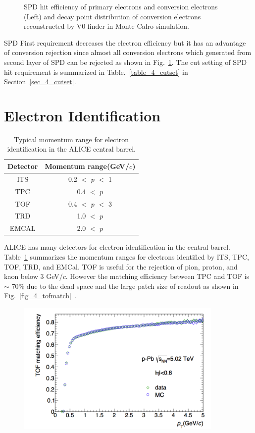 {\begin{figure}[h]
\begin{minipage}{0.5\hsize}
 \end{minipage}
  \caption{ 
  	SPD hit efficiency of primary electrons and conversion electrons (Left) and decay point distribution of conversion electrons reconstructed by V0-finder in Monte-Calro simulation.
  }
  \label{fig_4_spdhitdep}
\end{figure}
SPD First requirement decreases the electron efficiency but it has an advantage of conversion rejection since almost all conversion electrons which generated from second layer of SPD can be rejected as shown in Fig.~\ref{fig_4_spdhitdep}. 
The cut setting of SPD hit requirement is summarized in Table.~\ref{table_4_cutset} in Section~\ref{sec_4_cutset}.

\section{Electron Identification}
\label{sec_4_eid}
\begin{table}[!h]
  \centering
  \begin{tabular} {cc} \\ \hline
    Detector      &  Momentum range(GeV/$c$) \\ \hline
    ITS           &   0.2 $<$ $p$ $<$ 1 \\
    TPC           &   0.4 $<$ $p$ \\
    TOF           &   0.4 $<$ $p$ $<$ 3 \\
    TRD           &   1.0 $<$ $p$ \\
    EMCAL           &   2.0 $<$ $p$ \\ \hline
  \end{tabular}
  \caption{Typical momentum range for electron identification in the ALICE central barrel.}
  \label{table_4_eid}
\end{table}
ALICE has many detectors for electron identification in the central barrel.
Table~\ref{table_4_eid}  summarizes the momentum ranges for electrons identified by ITS, TPC, TOF, TRD, and EMCal.
TOF is useful for the rejection of pion, proton, and kaon below 3 GeV/$c$. 
However the matching efficiency between TPC and TOF is $\sim$ 70\% due to the dead space and the large patch size of readout as shown in Fig.~\ref{fig_4_tofmatch}~\cite{bib_aprrun1}. 
\begin{figure}[!h]
  \centering
  \includegraphics[width=10cm]{chap4/figure/TOF/tofmatcheff.png}

\end{figure}}
